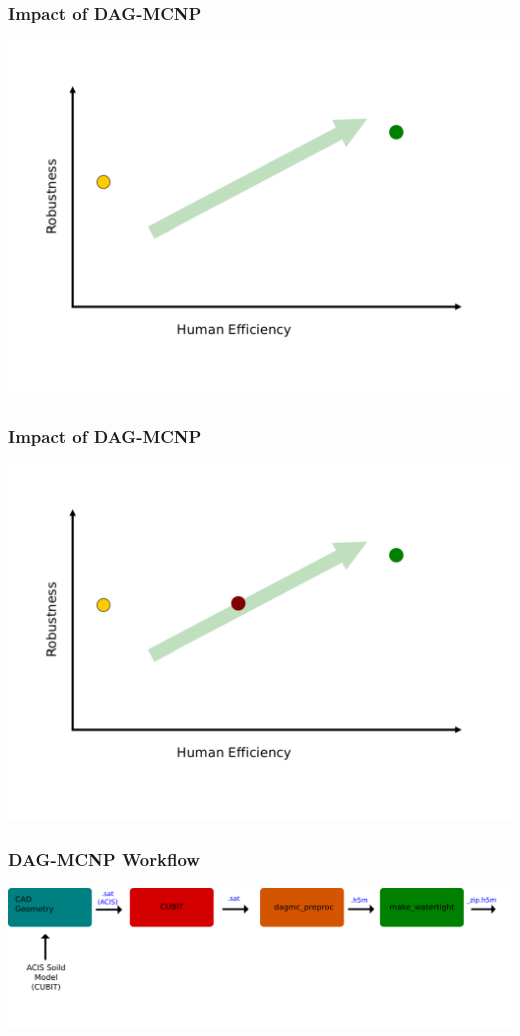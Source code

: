 \documentclass[14pt]{beamer}
\begin{document}
\begin{frame}
\frametitle{Impact of DAG-MCNP}
\vfill
\includegraphics[scale=0.43, trim = 0 0 28 0]{QualityGraph.png}
\end{frame}

\begin{frame}
\frametitle{Impact of DAG-MCNP}
\includegraphics[scale=0.43, trim = 0 0 28 0]{InitialGraphImpact.png}
\end{frame}


\begin{frame}
\frametitle{DAG-MCNP Workflow}
\begin{center}
\includegraphics[scale=0.23, trim = 40 200 0 0]{DAGMC_Wrkflw1.png}
\end{center}
\end{frame}
\end{document}

